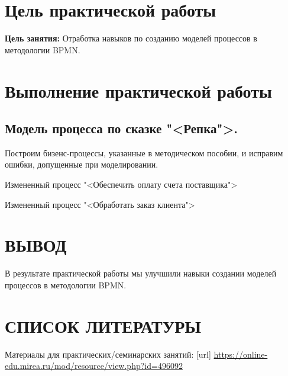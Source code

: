 \graphicspath{{./eleventh/img/}}

\section{Цель практической работы}
\textbf{Цель занятия:}
Отработка навыков по созданию моделей процессов в методологии BPMN.

\section{Выполнение практической работы}
\subsection{Модель процесса по сказке "<Репка">.}
Построим бизенс-процессы, указанные в методическом пособии, и исправим ошибки,
допущенные при моделировании.

\begin{image}
	\caption{Измененный процесс "<Обеспечить оплату счета поставщика">}
\end{image}

\begin{image}
	\caption{Измененный процесс "<Обработать заказ клиента">}
\end{image}

\section*{ВЫВОД}
В результате практической работы  мы улучшили навыки
создании моделей процессов в методологии BPMN.

\section*{СПИСОК ЛИТЕРАТУРЫ}
\begin{thebibliography}{}
    \bibitem{}  Материалы для практических/семинарских занятий: [url] 
		\url{https://online-edu.mirea.ru/mod/resource/view.php?id=496092}
\end{thebibliography}

